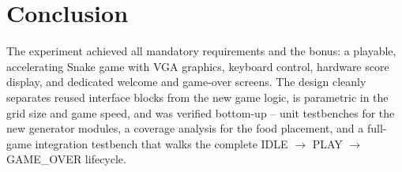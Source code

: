\documentclass[11pt,a4paper]{article}
\newcommand{\placeholderbox}[2]{%
  \begin{center}
    \setlength{\fboxsep}{10pt}\setlength{\fboxrule}{1pt}
    \fbox{\begin{minipage}[c][#1][c]{0.88\textwidth}\centering
      \textbf{\textcolor{red!60!black}{[PLACEHOLDER -- RESULT NOT YET AVAILABLE]}}\\[6pt]
      \small #2
    \end{minipage}}
  \end{center}}
\begin{document}


\section{Conclusion}
The experiment achieved all mandatory requirements and the bonus: a
playable, accelerating Snake game with VGA graphics, keyboard control,
hardware score display, and dedicated welcome and game-over screens. The
design cleanly separates reused interface blocks from the new game
logic, is parametric in the grid size and game speed, and was verified
bottom-up -- unit testbenches for the new generator modules, a coverage
analysis for the food placement, and a full-game integration testbench
that walks the complete IDLE $\rightarrow$ PLAY $\rightarrow$
GAME\_OVER lifecycle.
\end{document}
